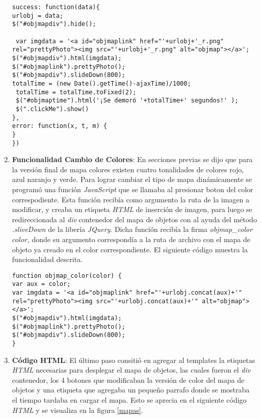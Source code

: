 \begin{enumerate}[label=\alph*) ,font=\bfseries]
\begin{lstlisting}[style=Java, caption={Función de despligue del Mapa de Objetos.}]
success: function(data){
urlobj = data;
$("#objmapdiv").hide();
  
 var imgdata = '<a id="objmaplink" href="'+urlobj+'_r.png" rel="prettyPhoto"><img src="'+urlobj+'_r.png" alt="objmap"></a>';
$("#objmapdiv").html(imgdata);
$("#objmaplink").prettyPhoto();
$("#objmapdiv").slideDown(800);
totalTime = (new Date().getTime()-ajaxTime)/1000;
 totalTime = totalTime.toFixed(2);
 $("#objmaptime").html('¡Se demoró '+totalTime+' segundos!' );
 $(".clickMe").show()
},
error: function(x, t, m) {
}
})
\end{lstlisting}
\item \textbf{Funcionalidad Cambio de Colores}: En secciones previas se dijo que para la versión 
final de mapa colores existen cuatro tonalidades de colores rojo, azul naranjo y verde. Para lograr
cambiar el tipo de mapa dinámicamente se programó una función \textit{JavaScript} que se llamaba al presionar boton del color correspodiente. Esta función recibía como argumento la ruta de la imagen
a modificar, y creaba un etiqueta \textit{HTML} de inserción de imagen, para luego se redireccionada
al \textit{div} contenedor del mapa de objetos con al ayuda del método \textit{.sliveDown\(\)} de la
libería \textit{JQuery}. Dicha función recibía la firma \textit{objmap_color\(color\)}, donde su 
argumento correspondía a la ruta de archivo con el mapa de objeto ya creado en el color 
correspondiente. El siguiente código muestra la funcionalidad descrita.
\newpage
\begin{lstlisting}[style=Java, caption={Función que genera el cambio de colores en el Mapa de Objetos.}]
function objmap_color(color) {
var aux = color;      
var imgdata = '<a id="objmaplink" href="'+urlobj.concat(aux)+'" rel="prettyPhoto"><img src="'+urlobj.concat(aux)+'" alt="objmap"></a>';
$("#objmapdiv").html(imgdata);
$("#objmaplink").prettyPhoto();
$("#objmapdiv").slideDown(800);
}
\end{lstlisting}
\item \textbf{Código HTML}: El último paso consitió en agregar al templates la etiquetas 
\textit{HTML} necesarias para desplegar el mapa de objetos, las cuales fueron el \textit{div}
contenedor, los 4 botones que modificaban la versión de color del mapa de objetos y una 
etiqueta que agregaba un pequeño parrafo donde se mostraba el tiempo tardaba en cargar el mapa.
Esto se aprecia en el siguiente código \textit{HTML} y se visualiza en la figura \ref{mapas}.
\begin{lstlisting}[style=Java, caption={Contenido \textit{HTML} donde se aloja el Mapa de Objetos.}]

\end{lstlisting}
\end{enumerate}

